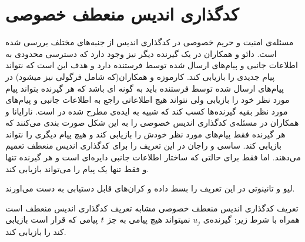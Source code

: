 \section{کدگذاری اندیس منعطف خصوصی}
مسئله‌ی امنیت و حریم خصوصی در کدگذاری اندیس از جنبه‌های مختلف بررسی شده است. دائو و همکاران در
\cite{6166891}
یک گیرنده دیگر نیز وجود دارد که دسترسی محدودی به اطلاعات جانبی و پیام‌های ارسال شده توسط فرستنده دارد و هدف این است که نتواند پیام جدیدی را بازیابی کند. کارموزه و همکاران(که شامل فرگولی نیز میشود) در
\cite{8006988}
پیام‌های ارسال شده توسط فرستنده باید به گونه ای باشد که هر گیرنده بتواند پیام مورد نظر خود را بازیابی ولی نتواند هیچ اطلاعاتی راجع به اطلاعات جانبی و پیام‌های مورد نظر بقیه گیرنده‌ها کسب کند که شبیه به ایده‌ی
	مطرح شده در
\cite{7889028}
است.
نارایانا و همکاران در
\cite{9627083}
مسئله‌ی کدگذاری اندیس خصوصی را به این شکل صورت بندی می‌کنند که هر گیرنده فقط پیام‌های مورد نظر خودش را بازیابی کند و هیچ پیام دیگری را نتواند بازیابی کند. ساسی و راجان در
\cite{sasi2019pliable}
این تعریف را برای کدگذاری اندیس منعطف تعمیم می‌دهند. اما فقط برای حالتی که ساختار اطلاعات جانبی دایره‌ای است و هر گیرنده تنها و فقط تنها یک پیام را می‌تواند بازیابی کند.

لیو و تانینوتی در 
\cite{8989161}
این تعریف را بسط داده و کران‌های قابل دستیابی به دست می‌اورند.

تعریف کدگذاری اندیس منعطف خصوصی مشابه تعریف کدگذاری اندیس منعطف است همراه با شرط زیر:
گیرنده‌ی
$u_j$
نمیتواند هیچ پیامی به جز
 $t$ 
 پیامی که قرار است بازیابی کند را بازیابی کند.